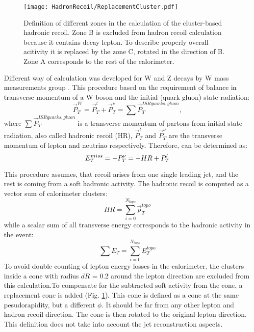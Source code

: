 \begin{figure}[!tbp]
\begin{center}
\begin{minipage}[h]{0.49\linewidth}
\texttt{[image: HadronRecoil/ReplacementCluster.pdf]}
\end{minipage}

\caption{Definition of different zones in the calculation of the cluster-based hadronic recoil. Zone B is excluded from hadron recoil calculation because it contains decay lepton. To describe properly overall acitivity it is replaced by the zone C, rotated in the direction of B. Zone A corresponds to the rest of the calorimeter\cite{HRPlots}.}
\label{ris:subsCone}
\end{center}
\end{figure}

Different way of \etmiss calculation  was developed for W and Z decays by W mass measurements group \cite{HadrRecoilFirst}. This procedure based on the requirement of balance in transverse momentum of a W-boson and the initial (quark-gluon) state radiation:
\begin{equation}
\vec{P}_{T}^{W} = \vec{P}_T^l+\vec{P}_T^{\nu}= \sum{\vec{P}_{T}^{ISRquarks,gluon}}, 
\end{equation}
where $\sum{\vec{P}_{T}^{ISRquarks,gluon}}$ is a transverse momentum of partons from initial state radiation, also called hadronic recoil (HR), $\vec{P}_T^l$ and $\vec{P}_T^{\nu}$ are the transverse momentum of lepton and neutrino respectively. Therefore, \etmiss can be determined as:
\begin{equation}
E_{T}^{miss} = - P_T^{\nu} =  - HR + P_T^l
\end{equation} 

This procedure assumes, that recoil arises from one single leading jet, and the rest  is coming from a soft hadronic activity. The hadronic recoil is computed as a vector sum of calorimeter clusters:
\begin{equation}
HR= \sum_{i=0}^{N_{topo}}\vec{p}_T^{topo}
\end{equation}
while a scalar sum of all transverse energy corresponds to the hadronic activity in the event:
\begin{equation}\label{eq:sumet}
\sum E_T =\sum_{i=0}^{N_{topo}} E_T^{topo}
\end{equation}
To avoid double counting of lepton energy losses in the calorimeter, the clusters inside a cone with radius $dR$ = 0.2 around the lepton direction are excluded from this calculation.To compensate for the subtracted soft activity from the cone, a replacement cone is added (Fig. \ref{ris:subsCone}). This cone is defined as a cone at the same pesudorapidity, but a different $\phi$. It should be far from any other lepton and hadron recoil direction. The cone is then rotated to the original lepton direction. This definition does not take into account the jet reconstruction aspects.   

